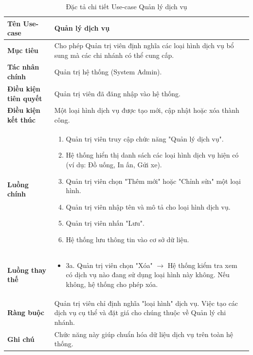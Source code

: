 \begin{table}[H]
\centering
\renewcommand{\arraystretch}{1.3}
\begin{tabular}{|p{4cm}|p{10cm}|}
\hline
\textbf{Tên Use-case} 
& Quản lý dịch vụ \\ 
\hline

\textbf{Mục tiêu} 
& Cho phép Quản trị viên định nghĩa các loại hình dịch vụ bổ sung mà các chi nhánh có thể cung cấp. \\ 
\hline

\textbf{Tác nhân chính} 
& Quản trị hệ thống (System Admin). \\ 
\hline

\textbf{Điều kiện tiên quyết} 
& Quản trị viên đã đăng nhập vào hệ thống. \\ 
\hline

\textbf{Điều kiện kết thúc} 
& Một loại hình dịch vụ được tạo mới, cập nhật hoặc xóa thành công. \\ 
\hline

\textbf{Luồng chính} 
& 
\begin{enumerate}
    \item Quản trị viên truy cập chức năng "Quản lý dịch vụ".
    \item Hệ thống hiển thị danh sách các loại hình dịch vụ hiện có (ví dụ: Đồ uống, In ấn, Gửi xe).
    \item Quản trị viên chọn "Thêm mới" hoặc "Chỉnh sửa" một loại hình.
    \item Quản trị viên nhập tên và mô tả cho loại hình dịch vụ.
    \item Quản trị viên nhấn "Lưu".
    \item Hệ thống lưu thông tin vào cơ sở dữ liệu.
\end{enumerate} \\ 
\hline

\textbf{Luồng thay thế} 
& 
\begin{itemize}
    \item 3a. Quản trị viên chọn "Xóa" $\rightarrow$ Hệ thống kiểm tra xem có dịch vụ nào đang sử dụng loại hình này không. Nếu không, hệ thống cho phép xóa.
\end{itemize} \\ 
\hline

\textbf{Ràng buộc} 
& Quản trị viên chỉ định nghĩa "loại hình" dịch vụ. Việc tạo các dịch vụ cụ thể và đặt giá cho chúng thuộc về Quản lý chi nhánh. \\ 
\hline

\textbf{Ghi chú} 
& Chức năng này giúp chuẩn hóa dữ liệu dịch vụ trên toàn hệ thống. \\ 
\hline
\end{tabular}
\caption{Đặc tả chi tiết Use-case Quản lý dịch vụ}
\label{tab:service-management-spec}
\end{table}


